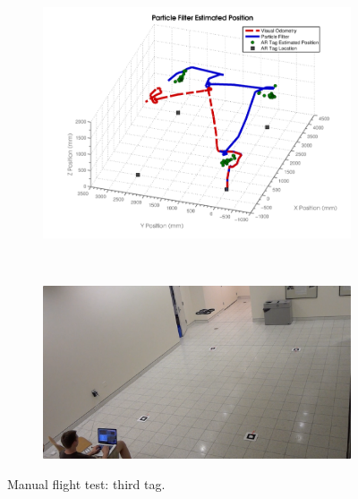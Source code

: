 	\begin{figure}[ht]
	        \centering
	        \begin{subfigure}[b]{0.75\textwidth}
	                \centering
	                \includegraphics[width=\textwidth]{../images/3dgraph_74.png}
	                \label{fig:tag3}
	        \end{subfigure}%
	        \\
	        \begin{subfigure}[b]{0.75\textwidth}
	                \centering
	                \includegraphics[width=\textwidth]{../images/frame3.png}
	                \label{fig:frame3}
	        \end{subfigure}
	        \caption{Manual flight test: third tag.}
	\end{figure}

